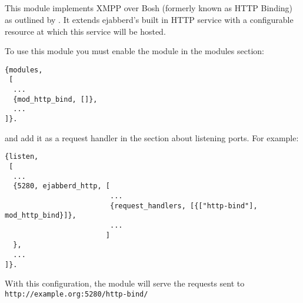 \subsection{\modhttpbind{}}
\label{modhttpbind}

This module implements XMPP over Bosh (formerly known as HTTP Binding)
as outlined by .
It extends ejabberd's built in HTTP service with a configurable
resource at which this service will be hosted.

To use this module you must enable the module in the modules section:
\begin{verbatim}
{modules,
 [
  ...
  {mod_http_bind, []},
  ...
]}.
\end{verbatim}
and add it as a request handler in the section about listening ports. For example:
\begin{verbatim}
{listen, 
 [
  ...
  {5280, ejabberd_http, [
                         ...
                         {request_handlers, [{["http-bind"], mod_http_bind}]},
                         ...
                        ]
  },
  ...
]}.
\end{verbatim}
With this configuration, the module will serve the requests sent to 
\verb|http://example.org:5280/http-bind/|
